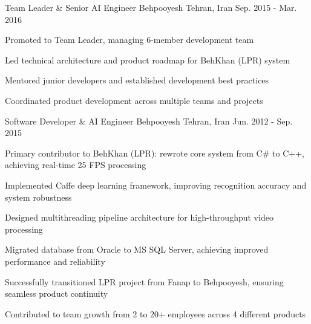 \begin{cventries}
  \cventry
    {Team Leader \& Senior AI Engineer} %
    {Behpooyesh} %
    {Tehran, Iran} %
    {Sep. 2015 - Mar. 2016} %
    {
      \begin{cvitems} %
        \item {Promoted to Team Leader, managing 6-member development team}
        \item {Led technical architecture and product roadmap for BehKhan (LPR) system}
        \item {Mentored junior developers and established development best practices}
        \item {Coordinated product development across multiple teams and projects}
      \end{cvitems}
    }

  \cventry
    {Software Developer \& AI Engineer} %
    {Behpooyesh} %
    {Tehran, Iran} %
    {Jun. 2012 - Sep. 2015} %
    {
      \begin{cvitems} %
        \item {Primary contributor to BehKhan (LPR): rewrote core system from C\# to C++, achieving real-time 25 FPS processing}
        \item {Implemented Caffe deep learning framework, improving recognition accuracy and system robustness}
        \item {Designed multithreading pipeline architecture for high-throughput video processing}
        \item {Migrated database from Oracle to MS SQL Server, achieving improved performance and reliability}
        \item {Successfully transitioned LPR project from Fanap to Behpooyesh, ensuring seamless product continuity}
        \item {Contributed to team growth from 2 to 20+ employees across 4 different products}
      \end{cvitems}
    }


\end{cventries}

